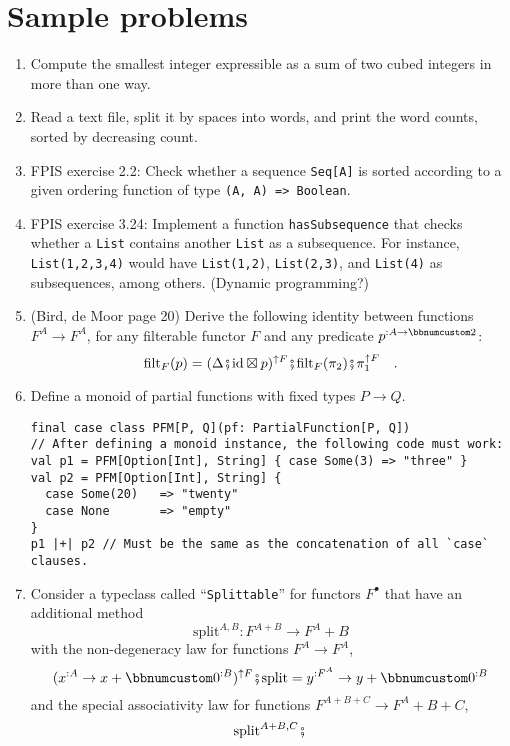 
\chapter{Sample problems}
\begin{enumerate}
\item Compute the smallest integer expressible as a sum of two cubed integers
in more than one way.
\item Read a text file, split it by spaces into words, and print the word
counts, sorted by decreasing count.
\item FPIS exercise 2.2: Check whether a sequence \lstinline!Seq[A]! is
sorted according to a given ordering function of type \lstinline!(A, A) => Boolean!.
\item FPIS exercise 3.24: Implement a function \lstinline!hasSubsequence!
that checks whether a \lstinline!List! contains another \lstinline!List!
as a subsequence. For instance, \lstinline!List(1,2,3,4)! would have
\lstinline!List(1,2)!, \lstinline!List(2,3)!, and \lstinline!List(4)!
as subsequences, among others. (Dynamic programming?)
\item (Bird, de Moor page 20) Derive the following identity between functions
$F^{A}\rightarrow F^{A}$, for any filterable functor $F$ and any
predicate $p^{:A\rightarrow\bbnum 2}$: 
\[
\text{filt}_{F}(p)=(\Delta\bef\text{id}\boxtimes p)^{\uparrow F}\bef\text{filt}_{F}(\pi_{2})\bef\pi_{1}^{\uparrow F}\quad.
\]
\item Define a monoid of partial functions with fixed types $P\rightarrow Q$.
\begin{lstlisting}
final case class PFM[P, Q](pf: PartialFunction[P, Q])
// After defining a monoid instance, the following code must work:
val p1 = PFM[Option[Int], String] { case Some(3) => "three" }
val p2 = PFM[Option[Int], String] {
  case Some(20)   => "twenty"
  case None       => "empty"
}
p1 |+| p2 // Must be the same as the concatenation of all `case` clauses.
\end{lstlisting}
\item Consider a typeclass called \textsf{``}\lstinline!Splittable!\textsf{''} for functors
$F^{\bullet}$ that have an additional method 
\[
\text{split}^{A,B}:F^{A+B}\rightarrow F^{A}+B
\]
with the non-degeneracy law for functions $F^{A}\rightarrow F^{A}$,
\[
(x^{:A}\rightarrow x+\bbnum 0^{:B})^{\uparrow F}\bef\text{split}=y^{:F^{A}}\rightarrow y+\bbnum 0^{:B}
\]
and the special associativity law for functions $F^{A+B+C}\rightarrow F^{A}+B+C$,
\[
\text{split}^{A+B,C}\bef\begin{array}{|c||cc|}

\end{array}\]
\end{enumerate}
